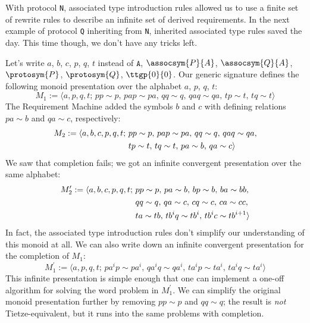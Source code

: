 \documentclass[../generics]{subfiles}
\begin{document}
\begin{example}
With protocol \texttt{N}, associated type introduction rules allowed us to use a finite set of rewrite rules to describe an infinite set of derived requirements. In the next example of protocol \texttt{Q} inheriting from \texttt{N}, inherited associated type rules saved the day. This time though, we don't have any tricks left.

\smallskip

Let's write $a$, $b$, $c$, $p$, $q$, $t$ instead of $\texttt{A}$, $\assocsym{P}{A}$, $\assocsym{Q}{A}$, $\protosym{P}$, $\protosym{Q}$, $\ttgp{0}{0}$. Our generic signature defines the following monoid presentation over the alphabet $a$, $p$, $q$, $t$:
\[M_1 := \langle a,p,q,t;\,pp\sim p,\,pap\sim pa,\,qq\sim q,\, qaq\sim qa,\, tp\sim t,\, tq\sim t\rangle\]
The Requirement Machine added the symbols $b$ and $c$ with defining relations $pa\sim b$ and $qa\sim c$, respectively:
\begin{align*}
M_2 := \langle a,b,c,p,q,t;\,\hbox{}&pp\sim p,\,pap\sim pa,\,qq\sim q,\, qaq\sim qa,\\
&tp\sim t,\, tq\sim t,\,pa\sim b,\,qa\sim c\rangle
\end{align*}
We saw that completion fails; we got an infinite convergent presentation over the same alphabet:
\begin{align*}
M_2^\prime := \langle a,b,c,p,q,t;\,\hbox{}&pp\sim p,\,pa\sim b,\,bp\sim b,\,ba\sim bb,\\
&qq\sim q,\,qa\sim c,\,cq\sim c,\,ca\sim cc,\\
&ta\sim tb,\, tb^iq\sim tb^i,\,tb^ic\sim tb^{i+1}\rangle
\end{align*}
In fact, the associated type introduction rules don't simplify our understanding of this monoid at all. We can also write down an infinite convergent presentation for the completion of $M_1$:
\[M_1^\prime := \langle a,p,q,t;\,pa^ip\sim pa^i,\, qa^iq\sim qa^i,\, ta^ip\sim ta^i,\, ta^iq\sim ta^i\rangle\]
This infinite presentation is simple enough that one can implement a one-off algorithm for solving the word problem in $M_1^\prime$. We can simplify the original monoid presentation further by removing $pp\sim p$ and $qq\sim q$; the result is \emph{not} Tietze-equivalent, but it runs into the same problems with completion.


\end{example}
\end{document}
